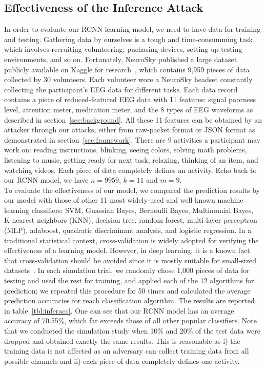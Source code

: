 \subsection{Effectiveness of the Inference Attack}
In order to evaluate our RCNN learning model, we need to have data for training and testing. Gathering data by ourselves is a tough and time-consumming task which involves recruiting volunteering, puchasing devices, setting up testing environments, and so on. Fortunately, NeuroSky published a large dataset publicly available on Kaggle for research~\cite{neuroskydata}, which contains 9,959 pieces of data collected by 30 volunteers. Each volunteer wore a NeuroSky headset constantly collecting the participant's EEG data for different tasks. Each data record contains a piece of reduced-featured EEG data with 11 features: signal poorness level, attention meter, meditation meter, and the 8 types of EEG waveforms as described in section~\ref{sec:background}. All these 11 features can be obtained by an attacker through our attacks, either from raw-packet format or JSON format as demonstrated in section~\ref{sec:framework}. There are 9 activities a participant may work on: reading instructions, blinking, seeing colors, solving math problems, listening to music, getting ready for next task, relaxing, thinking of an item, and watching videos. Each piece of data completely defines an activity. Echo back to our RCNN model, we have $n=9959$, $k=11$ and $m=9$.\\
%
\indent To evaluate the effectiveness of our model, we compared the prediction results by our model with those of other 11 most widely-used and well-known machine learning classifiers: SVM, Guassian Bayes, Bernoulli Bayes, Multinomial Bayes, K-nearest neighbors (KNN), decision tree, random forest, multi-layer perceptron (MLP), adaboost, quadratic discriminant analysis, and logistic regression. In a traditional statistical context, cross-validation is widely adopted for verifying the effectiveness of a learning model. However, in deep learning, it is a known fact that cross-validation should be avoided  since it is mostly suitable for small-sized datasets~\cite{deepcrossvalid}. In each simulation trial, we randomly chose 1,000 pieces of data for testing and used the rest for training, and applied each of the 12 algorithms for prediction; we repeated this procedure for 50 times and calculated the average prediction accuracies for reach classification algorithm. The results are reported in table~\ref{tbl:inferacc}. One can see that our RCNN model has an average accuracy of 70.55\%, which far exceeds those of all other popular classifiers. Note that we conducted the simulation study when 10\% and 20\% of the test data were dropped and obtained exactly the same results. This is reasonable as i) the training data is not affected as an adversary can collect training data from all possible channels and ii) each piece of data completely defines one activity. 

